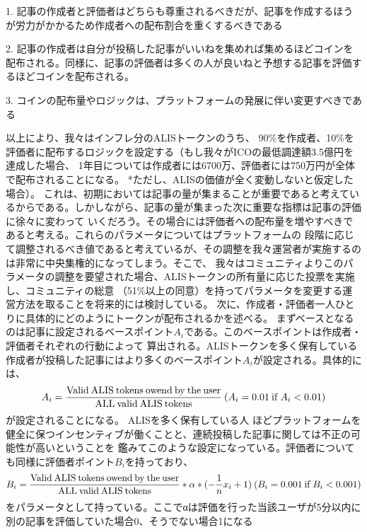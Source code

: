 \documentclass{jsarticle}
\begin{document}
1. 記事の作成者と評価者はどちらも尊重されるべきだが、記事を作成するほうが労力がかかるため作成者への配布割合を重くするべきである 

2. 記事の作成者は自分が投稿した記事がいいねを集めれば集めるほどコインを配布される。同様に、記事の評価者は多くの人が良いねと予想する記事を評価するほどコインを配布される。 

3. コインの配布量やロジックは、プラットフォームの発展に伴い変更すべきである 

以上により、我々はインフレ分のALISトークンのうち、
90\%を作成者、10\%を評価者に配布するロジックを設定する（もし我々がICOの最低調達額3.5億円を達成した場合、
1年目については作成者には6700万、評価者には750万円が全体で配布されることになる。 *ただし、ALISの価値が全く変動しないと仮定した場合）。
これは、初期においては記事の量が集まることが重要であると考えているからである。しかしながら、記事の量が集まった次に重要な指標は記事の評価に徐々に変わって
いくだろう。その場合には評価者への配布量を増やすべきであると考える。これらのパラメータについてはプラットフォームの
段階に応じて調整されるべき値であると考えているが、その調整を我々運営者が実施するのは非常に中央集権的になってしまう。そこで、
我々はコミュニティよりこのパラメータの調整を要望された場合、ALISトークンの所有量に応じた投票を実施し、コミュニティの総意
（51\%以上の同意）を持ってパラメータを変更する運営方法を取ることを将来的には検討している。
次に、作成者・評価者一人ひとりに具体的にどのようにトークンが配布されるかを述べる。
まずベースとなるのは記事に設定されるベースポイント$A_{i}$である。このベースポイントは作成者・評価者それぞれの行動によって
算出される。ALISトークンを多く保有している作成者が投稿した記事にはより多くのベースポイント$A_{i}$が設定される。具体的には、
\begin{align}
A_{i} = \frac{\rm Valid\:ALIS\:tokens\:owend\:by\:the\:user}{\rm ALL\:valid\:ALIS\:tokens}\:(A_{i} = 0.01\:{\rm if}\:A_{i} < 0.01)
\end{align}
が設定されることになる。 ALISを多く保有している人
ほどプラットフォームを健全に保つインセンティブが働くことと、連続投稿した記事に関しては不正の可能性が高いということを
鑑みてこのような設定になっている。評価者についても同様に評価者ポイント$B_{i}$を持っており、
\begin{align}
B_{i} = \frac{\rm Valid\:ALIS\:tokens\:owend\:by\:the\:user}{\rm ALL\:valid\:ALIS\:tokens} * \alpha * (-\frac{1}{n}x_{i}+1) \:(B_{i} = 0.001 {\rm\:if\:} B_{i} < 0.001)
\end{align}
をパラメータとして持っている。ここでαは評価を行った当該ユーザが5分以内に別の記事を評価していた場合0、そうでない場合1になる
\end{document}
